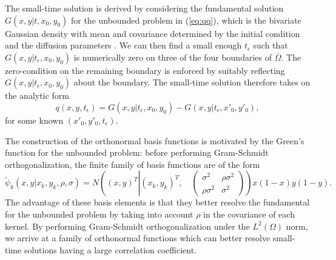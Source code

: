 \documentclass[10pt]{article}
\begin{document}
The small-time solution is derived by considering the fundamental
solution $G(x,y |t, x_0, y_0)$ for the unbounded problem in
(\ref{eq:qq}), which is the bivariate Gaussian density with mean and
covariance determined by the initial condition and the diffusion
parameters \citep{stakgold2011green}. We can then find a small enough
$t_\epsilon$ such that $G(x,y|t_\epsilon,x_0, y_0)$ is numerically
zero on three of the four boundaries of $\bar{\Omega}$. The
zero-condition on the remaining boundary is enforced by suitably
reflecting $G(x,y|t_\epsilon,x_0, y_0)$ about the boundary. The
small-time solution therefore takes on the analytic form
\[
  q(x,y,t_\epsilon) = G(x,y|t_\epsilon,x_0, y_0) - G(x,y|t_\epsilon,x'_0, y'_0),
\]
for some known $(x'_0, y'_0, t_\epsilon)$.

The construction of the orthonormal basis functions is motivated by
the Green's function for the unbounded problem: before performing
Gram-Schmidt orthogonalization, the finite family of basis functions
are of the form
\[
  \tilde{\psi}_k(x,y| x_k, y_k, \rho, \sigma) = N\left( (x,y)^T \left|
      (x_k, y_k)^T , \quad \left( \begin{array}{cc}
                                     \sigma^2 & \rho \sigma^2 \\
                                     \rho \sigma^2 & \sigma^2
                     \end{array} \right) \right. \right) x(1-x)y(1-y).
\]
The advantage of these basis elements is that they better resolve the
fundamental for the unbounded problem by taking into account $\rho$ in
the covariance of each kernel. By performing Gram-Schmidt
orthogonalization under the $L^2(\Omega)$ norm, we arrive at a family
of orthonormal functions which can better resolve small-time solutions
having a large correlation coefficient.

\end{document}

